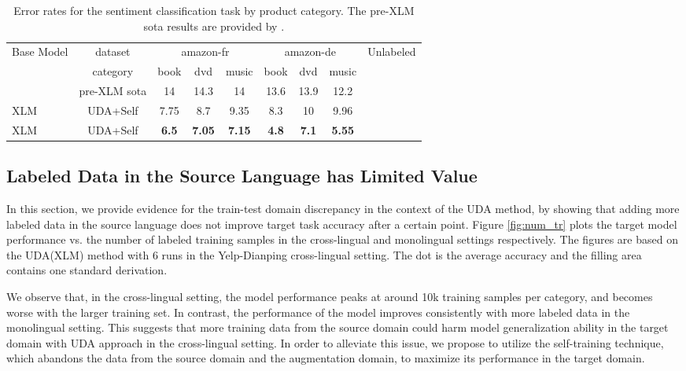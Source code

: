 \documentclass{article} \usepackage{iclr2020_conference,times}
\newcommand{\cmark}{\ding{51}}\newcommand{\xmark}{\ding{55}}\usepackage{hyperref}       \usepackage{url}            \usepackage{booktabs}       \usepackage[inline]{enumitem}
\begin{document}
\begin{table}[!ht]
\centering
    \begin{tabular}{l|c|ccc|ccc|c}
        \toprule
        Base Model & dataset         & \multicolumn{3}{|c|}{amazon-fr} & \multicolumn{3}{|c|}{amazon-de}  & Unlabeled         \\
        & category        & book & dvd    & music & book & dvd    & music & \\
        \midrule
        & pre-XLM sota   & 14      & 14.3      & 14       & 13.6    & 13.9      & 12.2 &  \cmark  \\
        \midrule
        XLM & UDA+Self   & 7.75    & 8.7       & 9.35     & 8.3     & 10        & 9.96 &  \cmark  \\
        XLM & UDA+Self & \textbf{6.5}     & \textbf{7.05}      & \textbf{7.15}     & \textbf{4.8}     & \textbf{7.1}       & \textbf{5.55} & \cmark \\    
        \bottomrule
    \end{tabular}
    \caption{Error rates for the sentiment classification task by product category. The pre-XLM sota results are provided by \cite{chen2019emoji}.}
\label{tab:sentiment2}
\end{table}

\subsection{Labeled Data in the Source Language has Limited Value}

In this section, we provide evidence for the train-test domain discrepancy in the context of the UDA method, by showing that adding more labeled data in the source language does not improve target task accuracy after a certain point.
Figure \ref{fig:num_tr} plots the target model performance vs. the number of labeled training samples in the cross-lingual and monolingual settings respectively. 
The figures are based on the UDA(XLM) method with 6 runs in the Yelp-Dianping cross-lingual setting. 
The dot is the average accuracy and the filling area contains one standard derivation. 

We observe that, in the cross-lingual setting, the model performance peaks at around 10k training samples per category, and becomes worse with the larger training set. 
In contrast, the performance of the model improves consistently with more labeled data in the monolingual setting.  
This suggests that more training data from the source domain could harm model generalization ability in the target domain with UDA approach in the cross-lingual setting. 
In order to alleviate this issue, we propose to utilize the self-training technique, which abandons the data from the source domain and the augmentation domain, to maximize its performance in the target domain.
\end{document}
